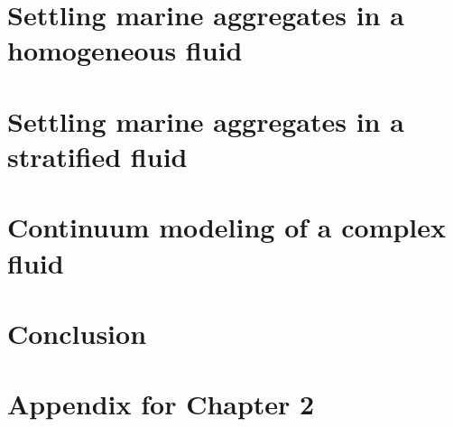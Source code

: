 \documentclass[11pt,oneside,chapterheads]{UCMerced}
\theoremstyle{plain}%
\theoremstyle{definition}
\begin{document}
\chapter{Settling marine aggregates in a homogeneous fluid}
\label{ch:2}



\chapter{Settling marine aggregates in a stratified fluid}
\label{ch:3}
 

\chapter{Continuum modeling of a complex fluid}
\label{ch:4}
 

\chapter{Conclusion}
\label{ch:conclusion}
 

\printbibliography

\appendix
\chapter{Appendix for Chapter 2}
\label{ap:chapter2}

\end{document}
